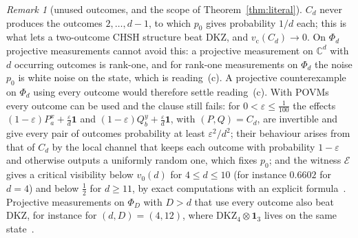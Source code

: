 \documentclass[11pt]{article}
\theoremstyle{remark}
\newtheorem{remark}[lemma]{Remark}
\numberwithin{equation}{section}
\newcommand{\C}{\mathbb{C}}
\newcommand{\one}{\mathbf{1}}
\newcommand{\cE}{\mathcal{E}}
\newcommand{\vc}{v_{\mathrm c}}
\newcommand{\DKZ}{\mathrm{DKZ}}
\begin{document}
\begin{remark}[unused outcomes, and the scope of Theorem~\ref{thm:literal}]\label{rem:scope}
$C_d$ never produces the outcomes $2,\dots,d-1$, to which $p_0$ gives probability $1/d$ each; this is what lets a
two-outcome CHSH structure beat DKZ, and $\vc(C_d)\to0$. On $\Phi_d$ projective measurements cannot avoid this: a
projective measurement on $\C^d$ with $d$ occurring outcomes is rank-one, and for rank-one measurements on $\Phi_d$ the
noise $p_0$ is white noise on the state, which is reading~(c). A projective counterexample on $\Phi_d$ using every outcome
would therefore settle reading~(c). With POVMs every outcome can be used and the clause still fails: for
$0<\varepsilon\le\frac1{100}$ the effects $(1-\varepsilon)P^x_a+\frac\varepsilon d\one$ and $(1-\varepsilon)Q^y_b+\frac\varepsilon d\one$,
with $(P,Q)=C_d$, are invertible and give every pair of outcomes probability at least $\varepsilon^2/d^2$; their behaviour
arises from that of $C_d$ by the local channel that keeps each outcome with probability $1-\varepsilon$ and otherwise
outputs a uniformly random one, which fixes $p_0$; and the witness $\cE$ gives a critical visibility below $v_0(d)$ for
$4\le d\le10$ (for instance $0.6602$ for $d=4$) and below $\frac12$ for $d\ge11$, by exact computations with an explicit
formula~\cite[Remark~9.12]{MSmath}. Projective measurements on $\Phi_D$ with $D>d$ that use every outcome also beat
DKZ, for instance for $(d,D)=(4,12)$, where $\DKZ_4\otimes\one_3$ lives on the same state~\cite[Remark~9.12]{MSmath}.
\end{remark}
\end{document}
